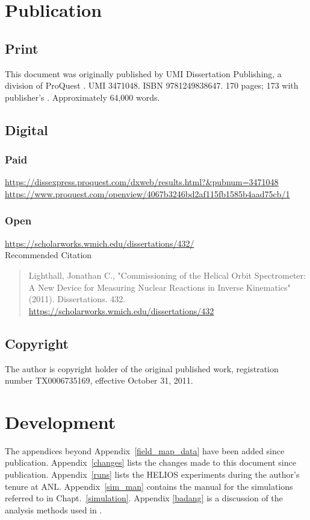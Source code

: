 \section{Publication}
\subsection{Print}
This document was originally published by UMI Dissertation Publishing, a division of ProQuest \cite{Lighthall_2011}. UMI 3471048. ISBN 9781249838647. 170 pages; 173 with publisher's . Approximately 64,000 words.

\subsection{Digital}
\subsubsection{Paid}
\noindent\url{https://dissexpress.proquest.com/dxweb/results.html?&pubnum=3471048}\\
\noindent\url{https://www.proquest.com/openview/4067b3246bd2af115fb1585b4aad75cb/1}
\subsubsection{Open}
\noindent\url{https://scholarworks.wmich.edu/dissertations/432/}\\
Recommended Citation
\begin{quote}
Lighthall, Jonathan C., "Commissioning of the Helical Orbit Spectrometer: A New Device for Measuring Nuclear Reactions in Inverse Kinematics" (2011). Dissertations. 432.\\
\url{https://scholarworks.wmich.edu/dissertations/432}
\end{quote}

\subsection{Copyright}
The author is copyright holder of the original published work, registration number TX0006735169, effective October 31, 2011.

\section{Development}
The appendices beyond Appendix~\ref{field_map_data} have been added since publication.
Appendix~\ref{changes} lists the changes made to this document since publication.
Appendix~\ref{runs} lists the HELIOS experiments during the author's tenure at ANL.
Appendix~\ref{sim_man} contains the manual for the simulations referred to in Chapt.~\ref{simulation}.
Appendix \ref{badang} is a discussion of the analysis methods used in \cite{Schiffer_2010}.

